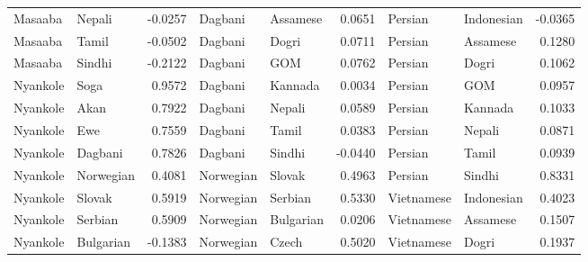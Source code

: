 \documentclass[11pt]{article} %
\begin{document}
\begin{table}
\begin{tabular}{llr@{\hspace{12pt}}llr@{\hspace{12pt}}llr}
            Masaaba                      & Nepali              & -0.0257       & Dagbani             & Assamese            & 0.0651        & Persian             & Indonesian          & -0.0365       \\
            Masaaba                      & Tamil               & -0.0502       & Dagbani             & Dogri               & 0.0711        & Persian             & Assamese            & 0.1280        \\
            Masaaba                      & Sindhi              & -0.2122       & Dagbani             & GOM                 & 0.0762        & Persian             & Dogri               & 0.1062        \\
            Nyankole                     & Soga                & 0.9572        & Dagbani             & Kannada             & 0.0034        & Persian             & GOM                 & 0.0957        \\
            Nyankole                     & Akan                & 0.7922        & Dagbani             & Nepali              & 0.0589        & Persian             & Kannada             & 0.1033        \\
            Nyankole                     & Ewe                 & 0.7559        & Dagbani             & Tamil               & 0.0383        & Persian             & Nepali              & 0.0871        \\
            Nyankole                     & Dagbani             & 0.7826        & Dagbani             & Sindhi              & -0.0440       & Persian             & Tamil               & 0.0939        \\
            Nyankole                     & Norwegian           & 0.4081        & Norwegian           & Slovak              & 0.4963        & Persian             & Sindhi              & 0.8331        \\
            Nyankole                     & Slovak              & 0.5919        & Norwegian           & Serbian             & 0.5330        & Vietnamese          & Indonesian          & 0.4023        \\
            Nyankole                     & Serbian             & 0.5909        & Norwegian           & Bulgarian           & 0.0206        & Vietnamese          & Assamese            & 0.1507        \\
            Nyankole                     & Bulgarian           & -0.1383       & Norwegian           & Czech               & 0.5020        & Vietnamese          & Dogri               & 0.1937        \\

\end{tabular}
\end{table}
\end{document}
